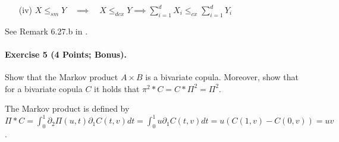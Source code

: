 \documentclass{article}
\begin{document}
\begin{itemize}
\item [(iv)] $X\leq_{sm}Y\quad\implies\quad X\leq_{dcx}Y\implies\sum_{i=1}^dX_i\leq_{cx}\sum_{i=1}^dY_i$
\end{itemize}
See Remark 6.27.b in \cite{ruschendorf2013mathematical}.

\paragraph{Exercise 5 \textnormal{(4 Points; Bonus)}.} Show that the Markov product $A\times B$ is a bivariate copula.
Moreover, show that for a bivariate copula $C$ it holds that
$\pi^2*C=C*\Pi^2=\Pi^2$.

The Markov product is defined by $\Pi*C=\int_0^1\partial_2\Pi(u,t)\partial_1 C(t,v)dt=\int_0^1 u\partial_1 C(t,v)dt=u(C(1,v)-C(0,v))=uv$.

\end{document}
